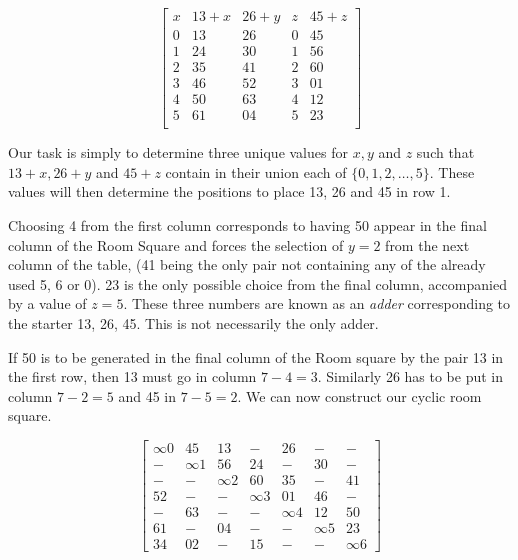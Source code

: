 \documentclass[
  11pt,
  a4paper]{book}
\begin{document}
\begin{equation}
  \begin{bmatrix}
    x &  13 + x & 26 + y & z & 45 + z \\
    0 &    13   &   26   & 0 &   45   \\
    1 &    24   &   30   & 1 &   56   \\
    2 &    35   &   41   & 2 &   60   \\
    3 &    46   &   52   & 3 &   01   \\
    4 &    50   &   63   & 4 &   12   \\
    5 &    61   &   04   & 5 &   23   \\
  \end{bmatrix}
  \label{eq:adder}
\end{equation}

Our task is simply to determine three unique values for \(x, y\) and \(z\) such that \(13 + x, 26 + y\) and \(45 + z\) contain
in their union each of \(\{0, 1, 2, \ldots, 5\}\). These
values will then determine the positions to place 13, 26 and
45 in row 1.

Choosing 4 from the first column corresponds to having 50
appear in the final column of the Room Square and forces the
selection of \(y = 2\) from the next column of the table, (41
being the only pair not containing any of the already used
5, 6 or 0). 23 is the only possible choice from the final
column, accompanied by a value of \(z = 5\). These three
numbers are known as an \emph{adder} corresponding to the starter
13, 26, 45. This is not necessarily the only adder.

If 50 is to be generated in the final column of the Room
square by the pair 13 in the first row, then 13 must go in
column \(7 - 4 = 3\). Similarly 26 has to be put in column
\(7 - 2 = 5\) and 45 in \(7 - 5 = 2\). We can now construct our
cyclic room square.

\begin{equation}
  \begin{bmatrix}
    ∞0 &  45 &  13 &   - &  26 &   - &   - \\
     - &  ∞1 &  56 &  24 &   - &  30 &   - \\
     - &   - &  ∞2 &  60 &  35 &   - &  41 \\
    52 &   - &   - &  ∞3 &  01 &  46 &   - \\
     - &  63 &   - &   - &  ∞4 &  12 &  50 \\
    61 &   - &  04 &   - &   - &  ∞5 &  23 \\
    34 &  02 &   - &  15 &   - &   - &  ∞6 
  \end{bmatrix}
  \label{eq:cyclic-room}
\end{equation}
\end{document}
